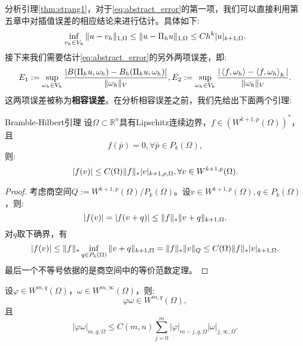 分析引理\ref{thm:strang1}，对于\eqref{eq:abstract_error}的第一项，我们可以直接利用第五章中对插值误差的相应结论来进行估计。具体如下:
\begin{equation}
    \inf_{v_{h}\in V_{h}}\|u-v_{h}\|_{1,\Omega}\le\|u-\Pi_{h}u\|_{1,\Omega}\le Ch^{k}|u|_{k+1,\Omega}.
\end{equation}
接下来我们需要估计\eqref{eq:abstract_error}的另外两项误差，即:
\begin{equation}
    E_{1}:=\sup_{\omega_{h}\in V_{h}}\frac{|B(\Pi_{h}u,\omega_{h})-B_{h}(\Pi_{h}u,\omega_{h})|}{\|\omega_{h}\|_{V}},E_{2}:=\sup_{\omega_{h}\in V_{h}}\frac{|\left<f,\omega_{h}\right>-\left<f,\omega_{h}\right>_{h}|}{\|\omega_{h}\|_{V}}.
\end{equation}
这两项误差被称为\textbf{相容误差}。在分析相容误差之前，我们先给出下面两个引理:
\begin{theorem}{Bramble-Hilbert引理}
    \label{thm:B-H Lem}
   设$\Omega\subset\mathbb{R}^{n}$具有Lipschitz连续边界，$f\in (W^{k+1,p}(\Omega))^{*}$，且
   \begin{equation}
        f(\bar{p})=0,\forall \bar{p}\in P_{k}(\Omega),
   \end{equation} 
   则:
   \begin{equation}
    |f(v)|\le C(\Omega)\|f\|_{*}|v|_{k+1,p,\Omega},\forall v\in W^{k+1,p}(\Omega).
   \end{equation}
\end{theorem}
\begin{proof}
    考虑商空间$Q:=W^{k+1,p}(\Omega)/P_{k}(\Omega)$。设$v\in W^{k+1,p}(\Omega),q\in P_{k}(\Omega)$，则:
    \begin{equation}
        |f(v)|=|f(v+q)|\le\|f\|_{*}\|v+q\|_{k+1,\Omega}.
    \end{equation}
    对$q$取下确界，有
    \begin{equation}
        |f(v)|\le\|f\|_{*}\inf_{q\in P_{k}(\Omega)}\|v+q\|_{k+1,\Omega}=\|f\|_{*}\|v\|_{Q}\le C(\Omega)\|f\|_{*}|v|_{k+1,\Omega}.
    \end{equation}
    最后一个不等号依据的是商空间中的等价范数定理。
\end{proof}
\begin{lemma}
    设$\varphi\in W^{m,q}(\Omega)$，$\omega\in W^{m,\infty}(\Omega)$，则:
    \begin{equation}
        \varphi\omega\in W^{m,q}(\Omega),
    \end{equation}
    且
    \begin{equation}
        |\varphi\omega|_{m,q,\Omega}\le C(m,n)\sum_{j=0}^{m}|\varphi|_{m-j,q,\Omega}|\omega|_{j,\infty,\Omega}.
    \end{equation}
\end{lemma}
